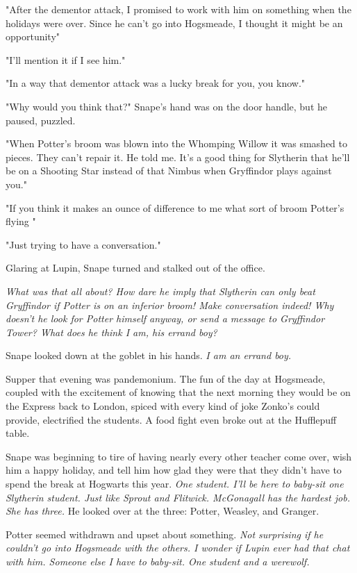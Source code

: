 "After the dementor attack, I promised to work with him on something when the holidays were over. Since he can't go into Hogsmeade, I thought it might be an opportunity{\el}"

"I'll mention it if I see him."

"In a way that dementor attack was a lucky break for you, you know."

"Why would you think that?" Snape's hand was on the door handle, but he paused, puzzled.

"When Potter's broom was blown into the Whomping Willow it was smashed to pieces. They can't repair it. He told me. It's a good thing for Slytherin that he'll be on a Shooting Star instead of that Nimbus when Gryffindor plays against you."

"If you think it makes an ounce of difference to me what sort of broom Potter's flying{\el} "

"Just trying to have a conversation."

Glaring at Lupin, Snape turned and stalked out of the office.

\emph{What was that all about? How dare he imply that Slytherin can only beat Gryffindor if Potter is on an inferior broom! Make conversation indeed! Why doesn't he look for Potter himself anyway, or send a message to Gryffindor Tower? What does he think I am, his errand boy?}

Snape looked down at the goblet in his hands. \emph{I am an errand boy.}

Supper that evening was pandemonium. The fun of the day at Hogsmeade, coupled with the excitement of knowing that the next morning they would be on the Express back to London, spiced with every kind of joke Zonko's could provide, electrified the students. A food fight even broke out at the Hufflepuff table.

Snape was beginning to tire of having nearly every other teacher come over, wish him a happy holiday, and tell him how glad they were that they didn't have to spend the break at Hogwarts this year. \emph{One student. I'll be here to baby-sit one Slytherin student. Just like Sprout and Flitwick. McGonagall has the hardest job. She has three.} He looked over at the three: Potter, Weasley, and Granger.

Potter seemed withdrawn and upset about something. \emph{Not surprising if he couldn't go into Hogsmeade with the others. I wonder if Lupin ever had that chat with him. Someone else I have to baby-sit. One student and a werewolf.}

